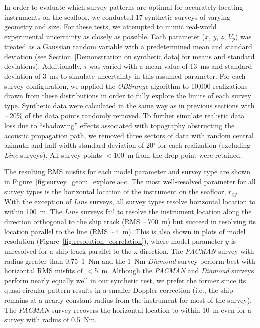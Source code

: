 In order to evaluate which survey patterns are optimal for accurately locating instruments on the seafloor, we conducted 17 synthetic surveys of varying geometry and size. For these tests, we attempted to mimic real-world experimental uncertainty as closely as possible. Each parameter ($x$, $y$, $z$, $V_p$) was treated as a Gaussian random variable with a predetermined mean and standard deviation (see Section~\ref{Demonstration on synthetic data} for means and standard deviations). Additionally, $\tau$ was varied with a mean value of 13~ms and standard deviation of 3~ms to simulate uncertainty in this assumed parameter. For each survey configuration, we applied the \textit{OBSrange} algorithm to 10,000 realizations drawn from these distributions in order to fully explore the limits of each survey type. Synthetic data were calculated in the same way as in previous sections with $\sim$20\% of the data points randomly removed. To further simulate realistic data loss due to ``shadowing'' effects associated with topography obstructing the acoustic propagation path, we removed three sectors of data with random central azimuth and half-width standard deviation of 20$^{\circ}$ for each realization (excluding \textit{Line} surveys). All survey points $<$100~m from the drop point were retained.

The resulting RMS misfits for each model parameter and survey type are shown in Figure~\ref{fig:survey_geom_explore}a--c. The most well-resolved parameter for all survey types is the horizontal location of the instrument on the seafloor, $r_{xy}$. With the exception of \textit{Line} surveys, all survey types resolve horizontal location to within 100~m. The \textit{Line} surveys fail to resolve the instrument location along the direction orthogonal to the ship track (RMS $\sim$700~m) but succeed in resolving its location parallel to the line (RMS $\sim$4~m). This is also shown in plots of model resolution (Figure~\ref{fig:resolution_correlation}), where model parameter $y$ is unresolved for a ship track parallel to the x-direction. The \textit{PACMAN} survey with radius greater than 0.75--1~Nm and the 1~Nm \textit{Diamond} survey perform best with horizontal RMS misfits of $<$5~m. Although the \textit{PACMAN} and \textit{Diamond} surveys perform nearly equally well in our synthetic test, we prefer the former since its quasi-circular pattern results in a smaller Doppler correction (i.e., the ship remains at a nearly constant radius from the instrument for most of the survey). The \textit{PACMAN} survey recovers the horizontal location to within 10~m even for a survey with radius of 0.5~Nm.

